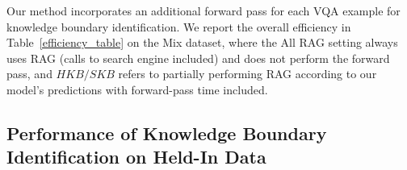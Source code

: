 \begin{table}
\small
\centering
{}
\caption{Efficiency illustration of Knowledge Boundary model Qwen-VL-7B-Chat (QW) and DeepSeek-VL-7B-Chat (DS). \textbf{Time} row shows the time spent before generating the answer in the VQA task.}
\label{efficiency_table}
\end{table}

Our method incorporates an additional forward pass for each VQA example for knowledge boundary identification. We report the overall efficiency in Table~\ref{efficiency_table} on the Mix dataset, where the All RAG setting always uses RAG (calls to search engine included) and does not perform the forward pass, and $HKB/SKB$ refers to partially performing RAG according to our model's predictions with forward-pass time included. 


\subsection{Performance of Knowledge Boundary Identification on Held-In Data}

